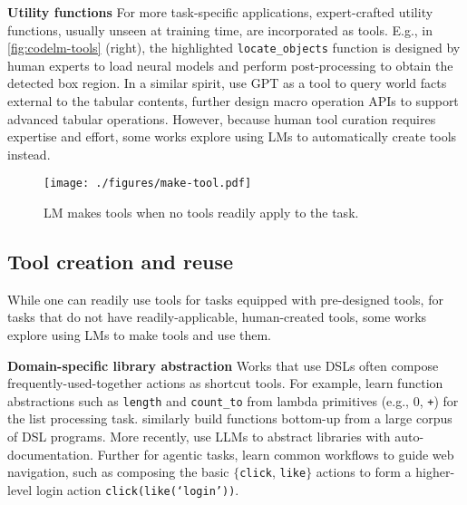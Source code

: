 \noindent \textbf{Utility functions} \quad
For more task-specific applications,
expert-crafted utility functions, usually unseen at training time, are incorporated as tools. E.g., in \autoref{fig:codelm-tools} (right), the highlighted \texttt{locate\_objects} function is designed by human experts \citep{gupta2022visual,suris2023vipergpt} to load neural models and perform post-processing to obtain the detected box region. In a similar spirit, \citet{cheng2023binding} use GPT as a tool to query world facts external to the tabular contents, \citet{cao2023api} further design macro operation APIs to support advanced tabular operations.
However, because human tool curation requires expertise and effort, some works explore using LMs to automatically create tools instead.




\begin{wrapfigure}[8]{r}{0.40\textwidth}
\vspace{-6mm}
\texttt{[image: ./figures/make-tool.pdf]}
\vspace{-2mm}
\caption{LM makes tools when no tools readily apply to the task.}
\label{fig:make-tool}
\end{wrapfigure}

\subsection{Tool creation and reuse}
\label{sub:make-tool}


While one can readily use tools for tasks equipped with pre-designed tools, for tasks that do not have readily-applicable, human-created tools, some works explore using LMs to make tools and use them.

\noindent \textbf{Domain-specific library abstraction} \quad
Works that use DSLs often compose frequently-used-together actions as shortcut tools. For example, \citet{ellis2023dreamcoder} learn function abstractions such as \texttt{length} and \texttt{count\_to} from lambda primitives (e.g., \texttt{$0$}, \texttt{+}) for the list processing task. 
\citet{pmlr-v139-wong21a,bowers2023top} similarly build functions bottom-up from a large corpus of DSL programs. More recently, \citet{grand2023lilo} use LLMs to abstract libraries with auto-documentation. 
Further for agentic tasks, \citet{zheran2018reinforcement} learn common workflows to guide web navigation, such as composing the basic $\{$\texttt{click}, \texttt{like}$\}$ actions to form a higher-level login action \texttt{click(like(`login'))}.

